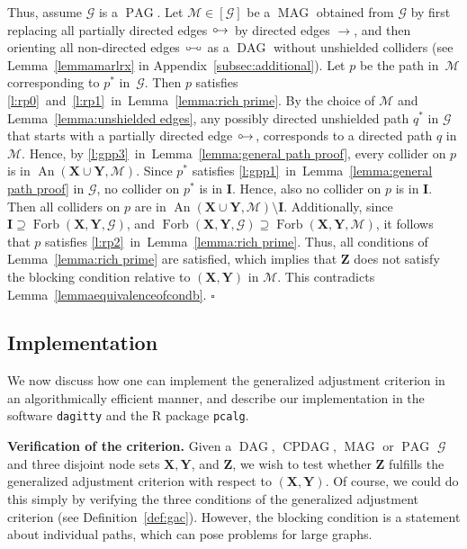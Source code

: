 \documentclass[11pt,a4paper]{article}
\newcommand{\bX}{\mathbf{X}}
\newcommand{\bY}{\mathbf{Y}}
\newcommand{\bZ}{\mathbf{Z}}
\newenvironment{proofof}[1][]{\begin{trivlist}
   \item[\hskip \labelsep {\bfseries Proof of #1.}]}{\hfill{}$\square$\end{trivlist}}
\DeclareMathOperator{\CPDAG}{CPDAG}
\DeclareMathOperator{\DAG}{DAG}
\DeclareMathOperator{\MAG}{MAG}
\DeclareMathOperator{\PAG}{PAG}
\DeclareMathOperator{\An}{An}
\DeclareMathOperator{\Forbi}{Forb}
\newcommand{\blck}{the blocking condition\xspace}
\newcommand{\g}[1][G]{\mathcal{#1}}
\newcommand{\fb}[2][X,Y]{\Forbi(\mathbf{#1},#2)}%
\newcommand{\pstar}[1][p]{{#1}^{*}}
\newcommand{\circarrow}{
  \setlength{\unitlength}{1mm}
  \begin{picture}(5,1)(0,0)
    \put(1,1){\circle{1}}
    \put(1.2,0){$\rightarrow$}
  \end{picture}
}
\newcommand{\circcirc}{
  \setlength{\unitlength}{1mm}
  \begin{picture}(5,1)(0,0)
    \put(1,1){\circle{1}}
    \put(1.5,1){\line(1,0){2}}
    \put(4,1){\circle{1}}
  \end{picture}
}
\begin{document}
\begin{proofof}[Theorem~\ref{theorem:general set proof}]
Thus, assume $\g$ is a $\PAG$.
 Let $\g[M] \in [\g]$ be a $\MAG$ obtained from $\g$ by first replacing all partially directed edges $\circarrow$ by directed edges $\rightarrow$, and then orienting all non-directed edges $\circcirc$ as a $\DAG$ without unshielded colliders (see Lemma~\ref{lemmamarlrx} in Appendix~\ref{subsec:additional}).
  Let $p$ be the path in~$\g[M]$ corresponding to  $\pstar$ in~$\g$.
 Then $p$ satisfies \ref{l:rp0}~and~\ref{l:rp1}~in~Lemma~\ref{lemma:rich prime}. By the choice of $\g[M]$ and Lemma~\ref{lemma:unshielded edges}, any possibly directed unshielded path $\pstar[q]$ in $\g$ that starts with a partially directed edge $\circarrow$, corresponds to a directed path $q$ in $\g[M]$. Hence, by \ref{l:gpp3}~in~Lemma~\ref{lemma:general path proof}, every collider on $p$ is in $\An(\mathbf{X} \cup \mathbf{Y},\g[M])$. Since $\pstar$ satisfies \ref{l:gpp1}~in~Lemma~\ref{lemma:general path proof} in $\g$, no collider on $\pstar$ is in $\mathbf{I}$. Hence, also no collider on $p$ is in $\mathbf{I}$. Then all colliders on $p$ are in $\An(\mathbf{X} \cup \mathbf{Y},\g[M]) \setminus \mathbf{I}$.
Additionally, since $\mathbf{I} \supseteq \fb{\g}$, and $\fb{\g} \supseteq \fb{\g[M]}$, it follows that $p$ satisfies \ref{l:rp2}~in~Lemma~\ref{lemma:rich prime}. Thus, all conditions of Lemma~\ref{lemma:rich prime} are satisfied, which implies that $\mathbf{Z}$ does not satisfy \blck{} relative to $(\mathbf{X,Y})$ in $\g[M]$. This contradicts Lemma~\ref{lemmaequivalenceofcondb}.
\end{proofof}

\subsection{Implementation} \label{sec:implementation}

We now discuss how one can implement the generalized adjustment criterion in an algorithmically efficient manner, and describe our implementation in the software \texttt{dagitty} and the R package \texttt{pcalg}.

\textbf{Verification of the criterion.} Given a $\DAG$, $\CPDAG$, $\MAG$ or $\PAG$ $\g$ and three disjoint node sets $\bX,\bY$, and $\bZ$, we wish to test whether $\bZ$ fulfills the generalized adjustment criterion with respect to $(\bX,\bY)$. Of course, we could do this simply by verifying the three conditions of the generalized adjustment criterion (see Definition~\ref{def:gac}). However, \blck is a statement about individual paths, which can pose problems for large graphs. 
\end{document}
